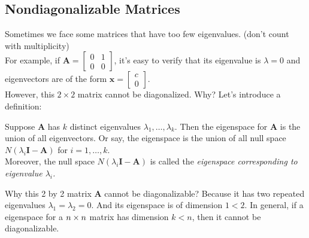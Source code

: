 \subsection{Nondiagonalizable Matrices}
Sometimes we face some matrices that have too few eigenvalues. (don't count with multiplicity)\\ For example, if $\bm A=\begin{bmatrix}
0&1\\0&0
\end{bmatrix}$, it's easy to verify that its eigenvalue is $\lambda=0$ and eigenvectors are of the form $\bm x=\begin{bmatrix}
c\\0
\end{bmatrix}$.\\
However, this $2\times 2$ matrix cannot be diagonalized. Why? Let's introduce a definition:\\
\begin{definition}[Eigenspace]
Suppose $\bm A$ has $k$ distinct eigenvalues $\lambda_1,\dots,\lambda_k$. Then the eigenspace for $\bm A$ is the union of all eigenvectors. Or say, the eigenspace is the union of all null space $N(\lambda_i\bm I-\bm A)$ for $i=1,\dots,k$.\\
Moreover, the null space $N(\lambda_i\bm I-\bm A)$ is called the \emph{eigenspace corresponding to eigenvalue $\lambda_i$.}
\end{definition}
Why this 2 by 2 matrix $\bm A$ cannot be diagonalizable? Because it has two repeated eigenvalues $\lambda_1=\lambda_2=0$. And its eigenspace is of dimension $1<2$. In general, if a eigenspace for a $n\times n$ matrix has dimension $k<n$, then it cannot be diagonalizable.














